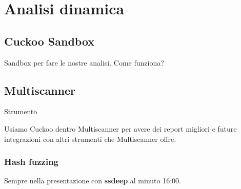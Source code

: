 \chapter{Analisi dinamica}

\section{Cuckoo Sandbox}
Sandbox per fare le nostre analisi.
Come funziona?

\section{Multiscanner}
Strumento \cite{anacondacon_multiscanner}

Usiamo Cuckoo dentro Multiscanner per avere dei report migliori e future integrazioni con altri strumenti che Multiscanner offre.

\subsection{Hash fuzzing}
Sempre nella presentazione \cite{anacondacon_multiscanner} con \textbf{ssdeep} al minuto 16:00.

